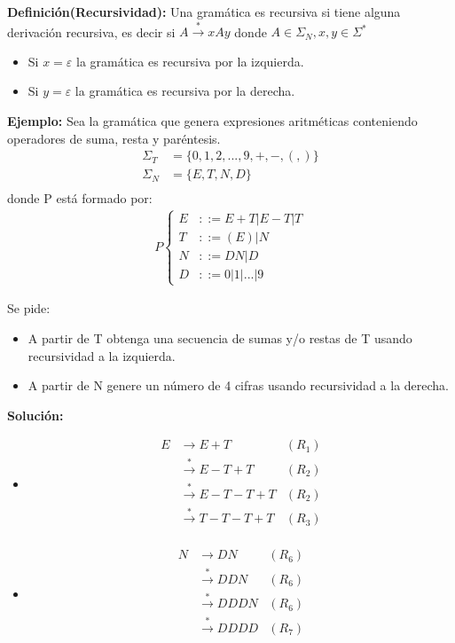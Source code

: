\textbf{Definición(Recursividad): }Una gramática es recursiva si tiene alguna derivación recursiva, es decir si $A\xrightarrow{*}xAy$ donde $A\in \Sigma_N, x,y\in \Sigma^*$
\begin{itemize}
\item Si $x=\varepsilon$ la gramática es recursiva por la izquierda.
\item Si $y=\varepsilon$ la gramática es recursiva por la derecha.
\end{itemize}

\textbf{Ejemplo: }Sea la gramática que genera expresiones aritméticas conteniendo operadores de suma, resta y paréntesis.
\begin{align*}
\Sigma_T	&=\{0,1,2,...,9,+,-,(,)\}	\\
\Sigma_N	&=\{E,T,N,D\}	\\
\end{align*}
donde P está formado por:
\begin{align*}
P\left \{\begin{array}{rl}
E	&::=E+T|E-T|T\\	
T	&::=(E)|N	\\
N	&::=DN|D	\\
D	&::=0|1|...|9	
\end{array}\right.
\end{align*}

Se pide:
\begin{itemize}
\item A partir de T obtenga una secuencia de sumas y/o restas de T usando recursividad a la izquierda.
\item A partir de N genere un número de 4 cifras usando recursividad a la derecha.
\end{itemize}

\textbf{Solución: }
\begin{itemize}
\item 
\begin{align*}
E	&\rightarrow E+T	\qquad &(R_1)	\\
	&\xrightarrow{*}E-T+T	&(R_2)	\\
	&\xrightarrow{*}E-T-T+T	&(R_2)	\\
	&\xrightarrow{*}T-T-T+T	&(R_3)	\\
\end{align*}
\item 
\begin{align*}
N	&\rightarrow DN		&(R_6)	\\
	&\xrightarrow{*}DDN	&(R_6)	\\
	&\xrightarrow{*}DDDN	&(R_6)	\\
	&\xrightarrow{*}DDDD	&(R_7)	\\
\end{align*}
\end{itemize}

